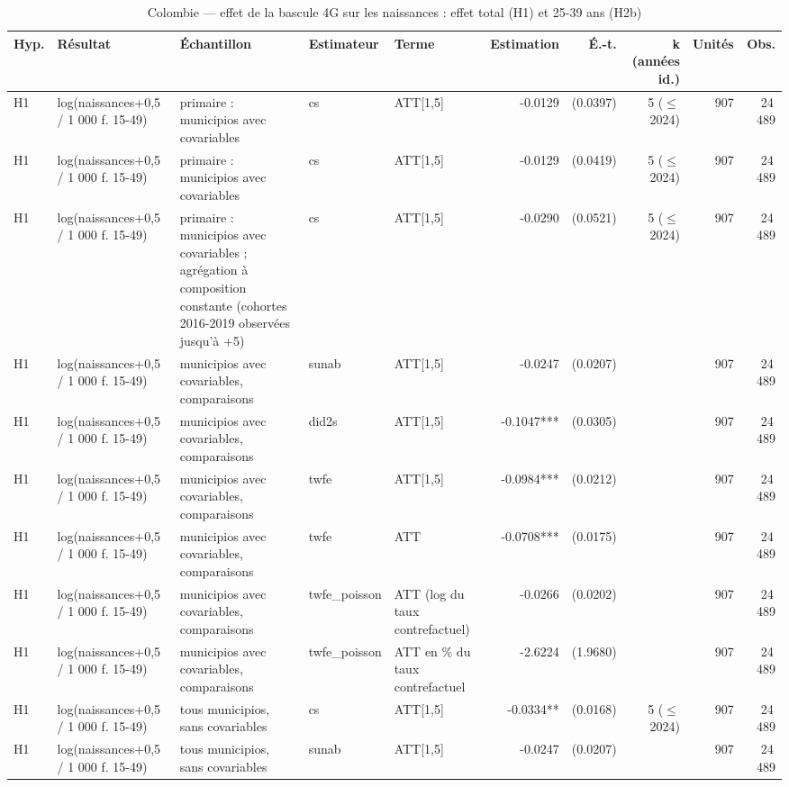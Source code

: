 \begin{table}\centering
\begin{threeparttable}
\caption{Colombie — effet de la bascule 4G sur les naissances : effet total (H1) et 25-39 ans (H2b)}\label{tab:co_main}
\scriptsize
\begin{tabular}{lp{3.8cm}p{6.6cm}lp{3.5cm}rrrrr}
\toprule
Hyp. & Résultat & Échantillon & Estimateur & Terme & Estimation & É.-t. & k (années id.) & Unités & Obs. \\
\midrule
H1 & log(naissances+0,5 / 1 000 f. 15-49) & primaire : municipios avec covariables & cs & ATT[1,5] & -0.0129 & (0.0397) & 5 ($\leq$ 2024) & 907 & 24\,489 \\
H1 & log(naissances+0,5 / 1 000 f. 15-49) & primaire : municipios avec covariables & cs & ATT[1,5] & -0.0129 & (0.0419) & 5 ($\leq$ 2024) & 907 & 24\,489 \\
H1 & log(naissances+0,5 / 1 000 f. 15-49) & primaire : municipios avec covariables ; agrégation à composition constante (cohortes 2016-2019 observées jusqu'à +5) & cs & ATT[1,5] & -0.0290 & (0.0521) & 5 ($\leq$ 2024) & 907 & 24\,489 \\
H1 & log(naissances+0,5 / 1 000 f. 15-49) & municipios avec covariables, comparaisons & sunab & ATT[1,5] & -0.0247 & (0.0207) &  & 907 & 24\,489 \\
H1 & log(naissances+0,5 / 1 000 f. 15-49) & municipios avec covariables, comparaisons & did2s & ATT[1,5] & -0.1047*** & (0.0305) &  & 907 & 24\,489 \\
H1 & log(naissances+0,5 / 1 000 f. 15-49) & municipios avec covariables, comparaisons & twfe & ATT[1,5] & -0.0984*** & (0.0212) &  & 907 & 24\,489 \\
H1 & log(naissances+0,5 / 1 000 f. 15-49) & municipios avec covariables, comparaisons & twfe & ATT & -0.0708*** & (0.0175) &  & 907 & 24\,489 \\
H1 & log(naissances+0,5 / 1 000 f. 15-49) & municipios avec covariables, comparaisons & twfe\_poisson & ATT (log du taux contrefactuel) & -0.0266 & (0.0202) &  & 907 & 24\,489 \\
H1 & log(naissances+0,5 / 1 000 f. 15-49) & municipios avec covariables, comparaisons & twfe\_poisson & ATT en \% du taux contrefactuel & -2.6224 & (1.9680) &  & 907 & 24\,489 \\
H1 & log(naissances+0,5 / 1 000 f. 15-49) & tous municipios, sans covariables & cs & ATT[1,5] & -0.0334** & (0.0168) & 5 ($\leq$ 2024) & 907 & 24\,489 \\
H1 & log(naissances+0,5 / 1 000 f. 15-49) & tous municipios, sans covariables & sunab & ATT[1,5] & -0.0247 & (0.0207) &  & 907 & 24\,489 \\

\end{tabular}
\end{threeparttable}
\end{table}
